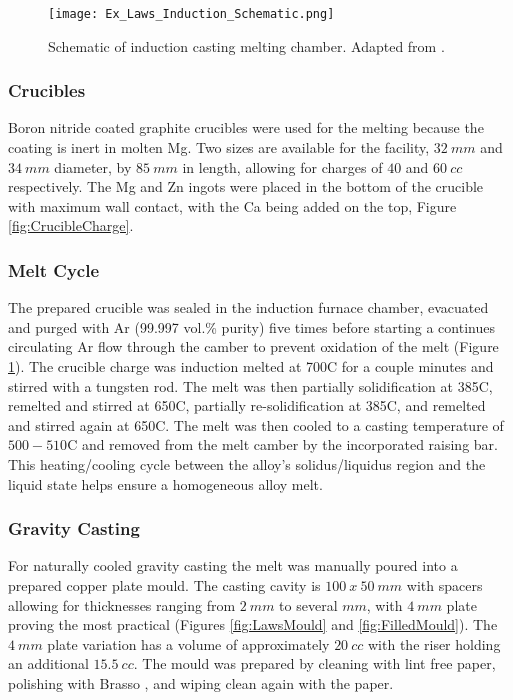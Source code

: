 \documentclass[a4paper,12pt,oneside]{report}%
\begin{document}
\begin{figure}[htbp]
	\centering
	\texttt{[image: Ex\_Laws\_Induction\_Schematic.png]}
	\caption[Schematic of induction casting melting chamber.]{Schematic of induction casting melting chamber. Adapted from \cite{Laws2007}.}
	\label{fig:CastingSchematic}
\end{figure}

\subsubsection{Crucibles}
Boron nitride coated graphite crucibles were used for the melting because the coating is inert in molten Mg. Two sizes are available for the facility, $32~ mm$ and $34~ mm$ diameter, by $85~ mm$ in length, allowing for charges of $40$ and $60~ cc$ respectively. The Mg and Zn ingots were placed in the bottom of the crucible with maximum wall contact, with the Ca being added on the top, Figure \ref{fig:CrucibleCharge}.

\subsubsection{Melt Cycle}
The prepared crucible was sealed in the induction furnace chamber, evacuated and purged with Ar (99.997 vol.\% purity) five times before starting a continues circulating Ar flow through the camber to prevent oxidation of the melt (Figure \ref{fig:CastingSchematic}). The crucible charge was induction melted at 700\degree C for a couple minutes and stirred with a tungsten rod. The melt was then partially solidification at 385\degree C, remelted and stirred at 650\degree C, partially re-solidification at 385\degree C, and remelted and stirred again at 650\degree C. The melt was then cooled to a casting temperature of $500- 510$\degree C and removed from the melt camber by the incorporated raising bar. This heating/cooling cycle between the alloy's solidus/liquidus region and the liquid state helps ensure a homogeneous alloy melt. 

\subsubsection{Gravity Casting}
For naturally cooled gravity casting the melt was manually poured into a prepared copper plate mould. The casting cavity is $100~ x~ 50~ mm$ with spacers allowing for thicknesses ranging from $2~ mm$ to several $mm$, with $4~ mm$ plate proving the most practical (Figures \ref{fig:LawsMould} and \ref{fig:FilledMould}). The $4~ mm$ plate variation has a volume of approximately $20~ cc$ with the riser holding an additional $15.5~ cc$. The mould was prepared by cleaning with lint free paper, polishing with Brasso \textcopyright, and wiping clean again with the paper.
\end{document}
